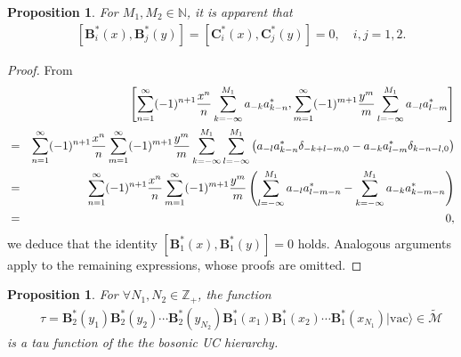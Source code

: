 \documentclass[10pt,a4paper]{amsart}
\numberwithin{equation}{section}
\newtheorem{proposition}[theorem]{Proposition}
\begin{document}
\begin{proposition}
For $M_{1},M_{2}\in\mathbb{N}$, it is apparent that
\begin{eqnarray}
&&[\mathbf{B}^{\ast}_{i}(x),\mathbf{B}^{\ast}_{j}(y)]
=[\mathbf{C}^{\ast}_{i}(x),\mathbf{C}^{\ast}_{j}(y)]=0,\quad i,j=1,2.
\end{eqnarray}
\end{proposition}

\begin{proof}
From
\begin{eqnarray}
&&\left[\sum\limits^{\infty}_{n=1}(-1)^{n+1}\frac{x^{n}}{n}\sum\limits^{M_{1}}
_{k=-\infty}a_{-k}a^{\ast}_{k-n},\sum\limits^{\infty}_{m=1}(-1)^{m+1}
\frac{y^{m}}{m}\sum\limits^{M_{1}}
_{l=-\infty}a_{-l}a^{\ast}_{l-m}\right]\notag\\
&=&\sum\limits^{\infty}_{n=1}(-1)^{n+1}\frac{x^{n}}{n}\sum\limits^{\infty}_{m=1}(-1)^{m+1}
\frac{y^{m}}{m}\sum\limits^{M_{1}}_{k=-\infty}\sum\limits^{M_{1}}_{l=-\infty}
\left(a_{-l}a^{\ast}_{k-n}\delta_{-k+l-m,0}-a_{-k}a^{\ast}_{l-m}\delta_{k-n-l,0}\right)\notag\\
&=&\sum\limits^{\infty}_{n=1}(-1)^{n+1}\frac{x^{n}}{n}\sum\limits^{\infty}_{m=1}(-1)^{m+1}
\frac{y^{m}}{m}\left(\sum\limits^{M_{1}}_{l=-\infty}a_{-l}a^{\ast}_{l-m-n}-\sum\limits^{M_{1}}
_{k=-\infty}a_{-k}a^{\ast}_{k-m-n}\right)\notag\\
&=&0,
\end{eqnarray}
we deduce that the identity $[\mathbf{B}^{\ast}_{1}(x),\mathbf{B}^{\ast}_{1}(y)]=0$ holds. Analogous arguments apply to the remaining expressions, whose proofs are omitted.
\end{proof}

\begin{proposition}
For $\forall N_{1}, N_{2}\in \mathbb{Z}_{+}$, the function
\begin{eqnarray}
&&\tau=\mathbf{B}^{\ast}_{2}(y_{1})\mathbf{B}^{\ast}_{2}(y_{2})\cdots
\mathbf{B}^{\ast}_{2}(y_{N_{2}})\mathbf{B}^{\ast}_{1}(x_{1})
\mathbf{B}^{\ast}_{1}(x_{2})\cdots\mathbf{B}^{\ast}_{1}(x_{N_{1}})|\text{vac}\rangle \in \mathcal{\widetilde{M}}
\end{eqnarray}
is a tau function of the the bosonic UC hierarchy.
\end{proposition}
\end{document}
